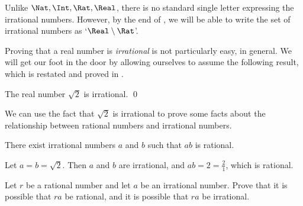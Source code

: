 Unlike $\Nat,\Int,\Rat,\Real$, there is no standard single letter expressing the irrational numbers. However, by the end of , we will be able to write the set of irrational numbers as `$\Real \setminus \Rat$'.

Proving that a real number is \textit{irrational} is not particularly easy, in general. We will get our foot in the door by allowing ourselves to assume the following result, which is restated and proved in .

\begin{proposition}
\label{propSqrt2IrrationalPreliminary}
The real number $\sqrt{2}$ is irrational. \qed
\end{proposition}


We can use the fact that $\sqrt{2}$ is irrational to prove some facts about the relationship between rational numbers and irrational numbers.

\begin{proposition}
There exist irrational numbers $a$ and $b$ such that $ab$ is rational.
\end{proposition}

\begin{cproof}
Let $a=b=\sqrt{2}$. Then $a$ and $b$ are irrational, and $ab=2=\frac{2}{1}$, which is rational.
\end{cproof}

\begin{exercise}
Let $r$ be a rational number and let $a$ be an irrational number. Prove that it is possible that $ra$ be rational, and it is possible that $ra$ be irrational.
\end{exercise}

